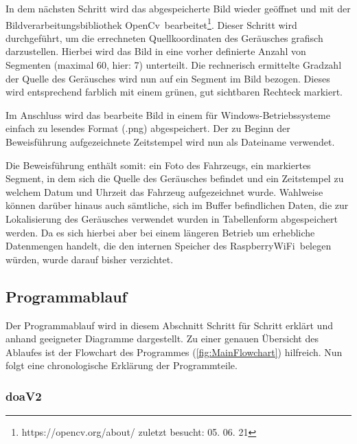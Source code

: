 In dem nächsten Schritt wird das abgespeicherte Bild wieder geöffnet und mit der Bildverarbeitungsbibliothek \glqq OpenCv\grqq\ bearbeitet\footnote{https://opencv.org/about/ zuletzt besucht: 05. 06. 21}. Dieser Schritt wird durchgeführt, um die errechneten Quellkoordinaten des Geräusches grafisch darzustellen. Hierbei wird das Bild in eine vorher definierte Anzahl von Segmenten (maximal 60, hier: 7) unterteilt. Die rechnerisch ermittelte Gradzahl der Quelle des Geräusches wird nun auf ein Segment im Bild bezogen. Dieses wird entsprechend farblich mit einem grünen, gut sichtbaren Rechteck markiert.

Im Anschluss wird das bearbeite Bild in einem für Windows-Betriebssysteme einfach zu lesendes Format (.png) abgespeichert. Der zu Beginn der Beweisführung aufgezeichnete Zeitstempel wird nun als Dateiname verwendet.

Die Beweisführung enthält somit: ein Foto des Fahrzeugs, ein markiertes Segment, in dem sich die Quelle des Geräusches befindet und ein Zeitstempel zu welchem Datum und Uhrzeit das Fahrzeug aufgezeichnet wurde. Wahlweise können darüber hinaus auch sämtliche, sich im Buffer befindlichen Daten, die zur Lokalisierung des Geräusches verwendet wurden in Tabellenform abgespeichert werden. Da es sich hierbei aber bei einem längeren Betrieb um erhebliche Datenmengen handelt, die den internen Speicher des \glqq RaspberryWiFi\grqq\ belegen würden, wurde darauf bisher verzichtet. 

\subsection{Programmablauf}

Der Programmablauf wird in diesem Abschnitt Schritt für Schritt erklärt und anhand geeigneter Diagramme dargestellt. Zu einer genauen Übersicht des Ablaufes ist der Flowchart des Programmes (\autoref{fig:MainFlowchart}) hilfreich. Nun folgt eine chronologische Erklärung der Programmteile.



\subsubsection{doaV2}

